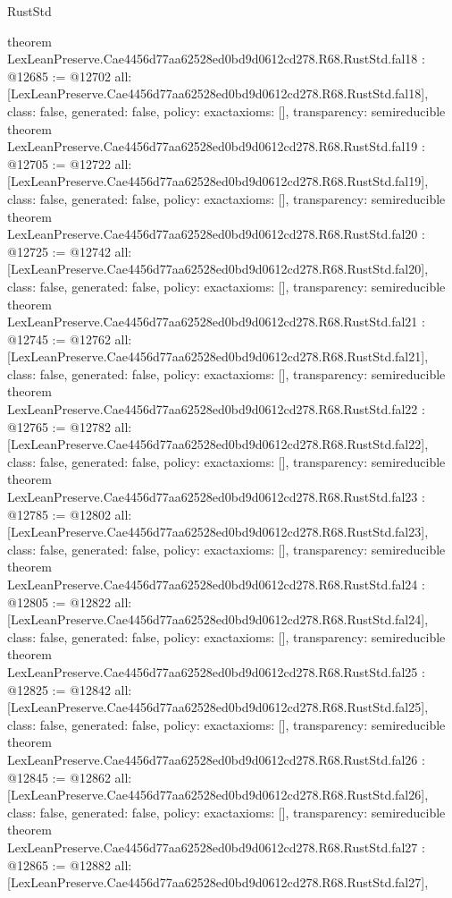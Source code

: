 \begin{lexlean}{RustStd}
\begin{coremodule}
{}
theorem LexLeanPreserve.Cae4456d77aa62528ed0bd9d0612cd278.R68.RustStd.fal18 : @12685 := @12702 {
  all: [LexLeanPreserve.Cae4456d77aa62528ed0bd9d0612cd278.R68.RustStd.fal18],
  class: false,
  generated: false,
  policy: exact{axioms: []},
  transparency: semireducible
}
theorem LexLeanPreserve.Cae4456d77aa62528ed0bd9d0612cd278.R68.RustStd.fal19 : @12705 := @12722 {
  all: [LexLeanPreserve.Cae4456d77aa62528ed0bd9d0612cd278.R68.RustStd.fal19],
  class: false,
  generated: false,
  policy: exact{axioms: []},
  transparency: semireducible
}
theorem LexLeanPreserve.Cae4456d77aa62528ed0bd9d0612cd278.R68.RustStd.fal20 : @12725 := @12742 {
  all: [LexLeanPreserve.Cae4456d77aa62528ed0bd9d0612cd278.R68.RustStd.fal20],
  class: false,
  generated: false,
  policy: exact{axioms: []},
  transparency: semireducible
}
theorem LexLeanPreserve.Cae4456d77aa62528ed0bd9d0612cd278.R68.RustStd.fal21 : @12745 := @12762 {
  all: [LexLeanPreserve.Cae4456d77aa62528ed0bd9d0612cd278.R68.RustStd.fal21],
  class: false,
  generated: false,
  policy: exact{axioms: []},
  transparency: semireducible
}
theorem LexLeanPreserve.Cae4456d77aa62528ed0bd9d0612cd278.R68.RustStd.fal22 : @12765 := @12782 {
  all: [LexLeanPreserve.Cae4456d77aa62528ed0bd9d0612cd278.R68.RustStd.fal22],
  class: false,
  generated: false,
  policy: exact{axioms: []},
  transparency: semireducible
}
theorem LexLeanPreserve.Cae4456d77aa62528ed0bd9d0612cd278.R68.RustStd.fal23 : @12785 := @12802 {
  all: [LexLeanPreserve.Cae4456d77aa62528ed0bd9d0612cd278.R68.RustStd.fal23],
  class: false,
  generated: false,
  policy: exact{axioms: []},
  transparency: semireducible
}
theorem LexLeanPreserve.Cae4456d77aa62528ed0bd9d0612cd278.R68.RustStd.fal24 : @12805 := @12822 {
  all: [LexLeanPreserve.Cae4456d77aa62528ed0bd9d0612cd278.R68.RustStd.fal24],
  class: false,
  generated: false,
  policy: exact{axioms: []},
  transparency: semireducible
}
theorem LexLeanPreserve.Cae4456d77aa62528ed0bd9d0612cd278.R68.RustStd.fal25 : @12825 := @12842 {
  all: [LexLeanPreserve.Cae4456d77aa62528ed0bd9d0612cd278.R68.RustStd.fal25],
  class: false,
  generated: false,
  policy: exact{axioms: []},
  transparency: semireducible
}
theorem LexLeanPreserve.Cae4456d77aa62528ed0bd9d0612cd278.R68.RustStd.fal26 : @12845 := @12862 {
  all: [LexLeanPreserve.Cae4456d77aa62528ed0bd9d0612cd278.R68.RustStd.fal26],
  class: false,
  generated: false,
  policy: exact{axioms: []},
  transparency: semireducible
}
theorem LexLeanPreserve.Cae4456d77aa62528ed0bd9d0612cd278.R68.RustStd.fal27 : @12865 := @12882 {
  all: [LexLeanPreserve.Cae4456d77aa62528ed0bd9d0612cd278.R68.RustStd.fal27],
}
\end{coremodule}
\end{lexlean}
